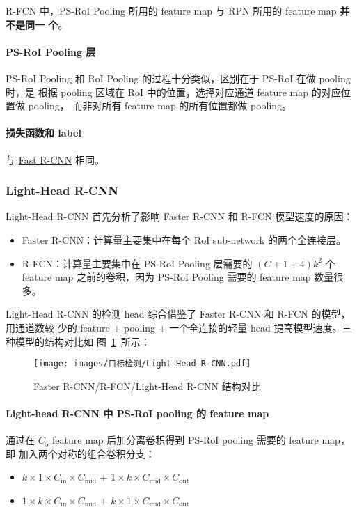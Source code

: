 R-FCN 中，PS-RoI Pooling 所用的 feature map 与 RPN 所用的 feature map \textbf{并不是同一
个}。

\paragraph{PS-RoI Pooling 层}
PS-RoI Pooling 和 RoI Pooling 的过程十分类似，区别在于 PS-RoI 在做 pooling 时，是
根据 pooling 区域在 RoI 中的位置，选择对应通道 feature map 的对应位置做 pooling，
而非对所有 feature map 的所有位置都做 pooling。

\paragraph{损失函数和 label}
与 \hyperref[subsec:Fast-R-CNN]{Fast R-CNN} 相同。

\subsubsection{Light-Head R-CNN}
Light-Head R-CNN 首先分析了影响 Faster R-CNN 和 R-FCN 模型速度的原因：

\begin{itemize}
  \item Faster R-CNN：计算量主要集中在每个 RoI sub-network 的两个全连接层。
  \item R-FCN：计算量主要集中在 PS-RoI Pooling 层需要的 $(C+1+4)k^2$ 个 feature
    map 之前的卷积，因为 PS-RoI Pooling 需要的 feature map 数量很多。
\end{itemize}

Light-Head R-CNN 的检测 head 综合借鉴了 Faster R-CNN 和 R-FCN 的模型，用通道数较
少的 feature + pooling + 一个全连接的轻量 head 提高模型速度。三种模型的结构对比如
图~\ref{fig:light-head}~所示：

\begin{figure}[ht]
  \centering
  \texttt{[image: images/目标检测/Light-Head-R-CNN.pdf]}
  \caption{Faster R-CNN/R-FCN/Light-Head R-CNN 结构对比}
  \label{fig:light-head}
\end{figure}

\paragraph{Light-head R-CNN 中 PS-RoI pooling 的 feature map}
通过在 $C_5$ feature map 后加分离卷积得到 PS-RoI pooling 需要的 feature map，即
加入两个对称的组合卷积分支：

\begin{itemize}
  \item $k \times 1 \times C_{\mathrm{in}} \times C_{\mathrm{mid}}$ + $1 \times k
    \times C_{\mathrm{mid}} \times C_{\mathrm{out}}$
  \item $1 \times k \times C_{\mathrm{in}} \times C_{\mathrm{mid}}$ + $k \times 1
    \times C_{\mathrm{mid}} \times C_{\mathrm{out}}$
\end{itemize}

